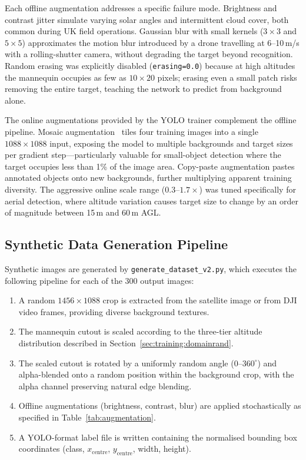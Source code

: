 Each offline augmentation addresses a specific failure mode. Brightness and contrast jitter simulate varying solar angles and intermittent cloud cover, both common during UK field operations. Gaussian blur with small kernels ($3\!\times\!3$ and $5\!\times\!5$) approximates the motion blur introduced by a drone travelling at 6--10\,m/s with a rolling-shutter camera, without degrading the target beyond recognition. Random erasing was explicitly disabled (\texttt{erasing=0.0}) because at high altitudes the mannequin occupies as few as $10\!\times\!20$ pixels; erasing even a small patch risks removing the entire target, teaching the network to predict from background alone.

The online augmentations provided by the YOLO trainer complement the offline pipeline. Mosaic augmentation~\cite{bochkovskiy2020yolov4} tiles four training images into a single $1088\!\times\!1088$ input, exposing the model to multiple backgrounds and target sizes per gradient step---particularly valuable for small-object detection where the target occupies less than 1\% of the image area. Copy-paste augmentation pastes annotated objects onto new backgrounds, further multiplying apparent training diversity. The aggressive online scale range ($0.3$--$1.7\times$) was tuned specifically for aerial detection, where altitude variation causes target size to change by an order of magnitude between 15\,m and 60\,m AGL.

\subsection{Synthetic Data Generation Pipeline}\label{sec:training:synthetic}

Synthetic images are generated by \texttt{generate\_dataset\_v2.py}, which executes the following pipeline for each of the 300 output images:

\begin{enumerate}
    \item A random $1456\times1088$ crop is extracted from the satellite image or from DJI video frames, providing diverse background textures.
    \item The mannequin cutout is scaled according to the three-tier altitude distribution described in Section~\ref{sec:training:domainrand}.
    \item The scaled cutout is rotated by a uniformly random angle ($0$--$360^{\circ}$) and alpha-blended onto a random position within the background crop, with the alpha channel preserving natural edge blending.
    \item Offline augmentations (brightness, contrast, blur) are applied stochastically as specified in Table~\ref{tab:augmentation}.
    \item A YOLO-format label file is written containing the normalised bounding box coordinates (class, $x_{\text{centre}}$, $y_{\text{centre}}$, width, height).
\end{enumerate}

